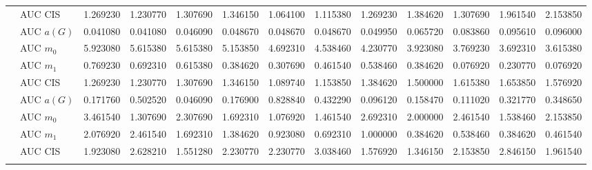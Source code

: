 \begin{table}[htbp]
\begin{tabular}{llrrrrrrrrrrr}
    & AUC CIS & 1.269230 & 1.230770 & 1.307690 & 1.346150 & 1.064100 & 1.115380 & 1.269230 & 1.384620 & 1.307690 & 1.961540 & 2.153850 \\
    \addlinespace
    \multirow{4}{*}{degree} & AUC $a(G)$ & 0.041080 & 0.041080 & 0.046090 & 0.048670 & 0.048670 & 0.048670 & 0.049950 & 0.065720 & 0.083860 & 0.095610 & 0.096000 \\
    & AUC $m_0$ & 5.923080 & 5.615380 & 5.615380 & 5.153850 & 4.692310 & 4.538460 & 4.230770 & 3.923080 & 3.769230 & 3.692310 & 3.615380 \\
    & AUC $m_1$ & 0.769230 & 0.692310 & 0.615380 & 0.384620 & 0.307690 & 0.461540 & 0.538460 & 0.384620 & 0.076920 & 0.230770 & 0.076920 \\
    & AUC CIS & 1.269230 & 1.230770 & 1.307690 & 1.346150 & 1.089740 & 1.153850 & 1.384620 & 1.500000 & 1.615380 & 1.653850 & 1.576920 \\
    \addlinespace
    \multirow{4}{*}{random} & AUC $a(G)$ & 0.171760 & 0.502520 & 0.046090 & 0.176900 & 0.828840 & 0.432290 & 0.096120 & 0.158470 & 0.111020 & 0.321770 & 0.348650 \\
    & AUC $m_0$ & 3.461540 & 1.307690 & 2.307690 & 1.692310 & 1.076920 & 1.461540 & 2.692310 & 2.000000 & 2.461540 & 1.538460 & 2.153850 \\
    & AUC $m_1$ & 2.076920 & 2.461540 & 1.692310 & 1.384620 & 0.923080 & 0.692310 & 1.000000 & 0.384620 & 0.538460 & 0.384620 & 0.461540 \\
    & AUC CIS & 1.923080 & 2.628210 & 1.551280 & 2.230770 & 2.230770 & 3.038460 & 1.576920 & 1.346150 & 2.153850 & 2.846150 & 1.961540 \\
    \addlinespace
    \bottomrule
  \end{tabular}
\end{table}

